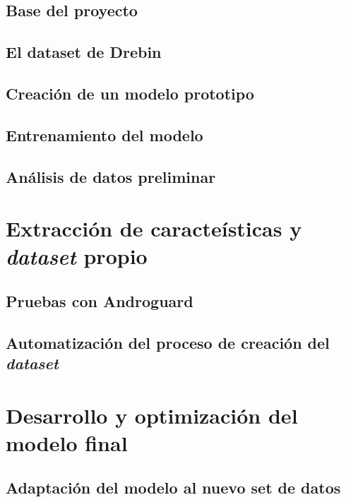 \subsection{Base del proyecto}

\subsection{El dataset de Drebin}

\subsection{Creación de un modelo prototipo}

\subsection{Entrenamiento del modelo}

\subsection{Análisis de datos preliminar}



\section{Extracción de caracteísticas y \textit{dataset} propio}

\subsection{Pruebas con Androguard}

\subsection{Automatización del proceso de creación del \textit{dataset}}



\section{Desarrollo y optimización del modelo final}

\subsection{Adaptación del modelo al nuevo set de datos}

